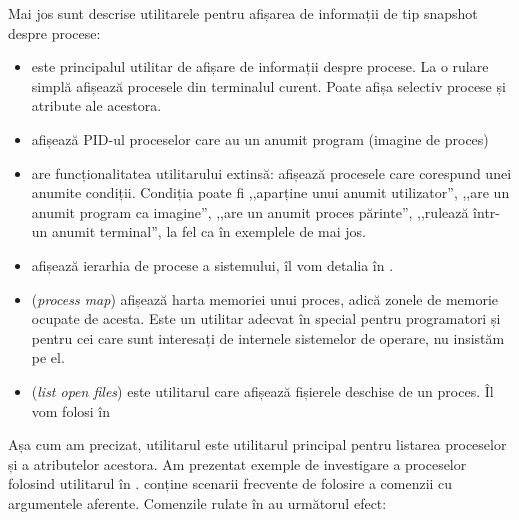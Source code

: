 Mai jos sunt descrise utilitarele pentru afișarea de informații de tip snapshot despre procese:

\begin{itemize}
  \item {} este principalul utilitar de afișare de informații despre procese.
    La o rulare simplă afișează procesele din terminalul curent.
    Poate afișa selectiv procese și atribute ale acestora.
  \item {} afișează PID-ul proceselor care au un anumit program (imagine de proces)
  \item {} are funcționalitatea utilitarului  extinsă: afișează procesele care corespund unei anumite condiții.
    Condiția poate fi ,,aparține unui anumit utilizator'', ,,are un anumit program ca imagine'', ,,are un anumit proces părinte'', ,,rulează într-un anumit terminal'', la fel ca în exemplele de mai jos.
  \item {} afișează ierarhia de procese a sistemului, îl vom detalia în .
  \item {} (\textit{process map}) afișează harta memoriei unui proces, adică zonele de memorie ocupate de acesta.
    Este un utilitar adecvat în special pentru programatori și pentru cei care sunt interesați de internele sistemelor de operare, nu insistăm pe el.
  \item {} (\textit{list open files}) este utilitarul care afișează fișierele deschise de un proces.
    Îl vom folosi în 
\end{itemize}

Așa cum am precizat, utilitarul  este utilitarul principal pentru listarea proceselor și a atributelor acestora.
Am prezentat exemple de investigare a proceselor folosind utilitarul  în .
 conține scenarii frecvente de folosire a comenzii  cu argumentele aferente.
Comenzile rulate în  au următorul efect:

